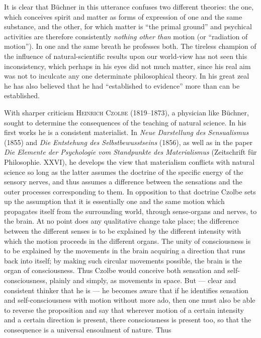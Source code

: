 \documentclass[12pt,a4paper]{book}
\newcommand{\opage}[1]{\marginnote{\footnotesize\textit{[#1]}}}
\begin{document}
It is clear that Büchner in this utterance confuses two different theories: the
one, which conceives spirit and matter as forms of expression of one and the
same substance, and the other, for which matter is ``the primal ground'' and
psychical activities are therefore consistently \emph{nothing other than} motion
(or ``radiation of motion''). In one and the same breath he professes both. The
tireless champion of the influence of natural-scientific results upon our
world-view has not seen this inconsistency, which perhaps in his eyes did not
much matter, since his real aim was not to inculcate any one determinate
philosophical theory. In his great zeal he has also believed that he had
``established to evidence'' more than can be established.

With sharper criticism \textsc{Heinrich Czolbe} (1819--1873), a physician like
Büchner, sought to determine the consequences of the teaching of natural
science. In his first works he is a consistent materialist. In \textit{Neue
Darstellung des Sensualismus} (1855) and \textit{Die Entstehung des
Selbstbewusstseins} (1856), as well as in the paper \textit{Die Elemente der
Psychologie vom Standpunkte des Materialismus} (Zeitschrift für Philosophie.
XXVI), he develops the view that materialism conflicts with natural science so
long as the latter assumes the doctrine of the specific energy of the sensory
nerves, and thus assumes a difference between the sensations and the outer
processes corresponding to them. In opposition to that doctrine Czolbe sets up
the assumption that it is essentially one and the same motion which propagates
itself from the surrounding world, through sense-organs and nerves, to the
brain. At no point does any qualitative change take place; the difference
between the different senses is to be explained by the different intensity with
which the motion proceeds in the different organs. The unity of consciousness is
to be explained by the movements in the brain acquiring a \opage{506}direction that runs
back into itself; by making such circular movements possible, the brain is the
organ of consciousness. Thus Czolbe would conceive both sensation and
self-consciousness, plainly and simply, as movements in space. But --- clear and
consistent thinker that he is --- he becomes aware that if he identifies
sensation and self-consciousness with motion without more ado, then one must
also be able to reverse the proposition and say that wherever motion of a
certain intensity and a certain direction is present, there consciousness is
present too, so that the consequence is a universal ensoulment of nature. Thus
\end{document}
